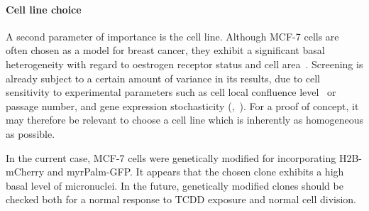 \paragraph{Cell line choice\\}
A second parameter of importance is the cell line. Although MCF-7 cells are often chosen as a model for breast cancer, they exhibit a significant basal heterogeneity with regard to oestrogen receptor status and cell area~\cite{pmid11153613}. Screening is already subject to a certain amount of variance in its results, due to cell sensitivity to experimental parameters such as cell local confluence level~\cite{pmid19710653} or passage number, and gene expression stochasticity (\cite{pmid12183631},~\cite{pmid18957198}). For a proof of concept, it may therefore be relevant to choose a cell line which is inherently as homogeneous as possible.

In the current case, MCF-7 cells were genetically modified for incorporating H2B-mCherry and myrPalm-GFP. It appears that the chosen clone exhibits a high basal level of micronuclei. In the future, genetically modified clones should be checked both for a normal response to TCDD exposure and normal cell division.


%

%
